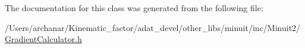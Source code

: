 The documentation for this class was generated from the following file\+:\begin{DoxyCompactItemize}
\item 
/\+Users/archanar/\+Kinematic\+\_\+factor/adat\+\_\+devel/other\+\_\+libs/minuit/inc/\+Minuit2/\mbox{\hyperlink{other__libs_2minuit_2inc_2Minuit2_2GradientCalculator_8h}{Gradient\+Calculator.\+h}}\end{DoxyCompactItemize}
